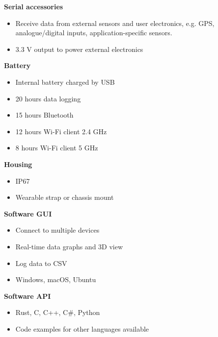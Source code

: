 \begin{multicols}{2}
\textbf{Serial accessories}
\begin{itemize}[nolistsep]
    \item Receive data from external sensors and user electronics, e.g. \acs{GPS}, analogue/digital inputs, application-specific sensors.
    \item 3.3 V output to power external electronics
\end{itemize}

\textbf{Battery}
\begin{itemize}[nolistsep]
    \item Internal battery charged by \acs{USB}
    \item 20 hours data logging
    \item 15 hours Bluetooth
    \item 12 hours Wi-Fi client 2.4 GHz
    \item 8 hours Wi-Fi client 5 GHz
\end{itemize}

\textbf{Housing}
\begin{itemize}[nolistsep]
    \item \acs{IP67}
    \item Wearable strap or chassis mount
\end{itemize}

\textbf{Software \acs{GUI}}
\begin{itemize}[nolistsep]
    \item Connect to multiple devices
    \item Real-time data graphs and 3D view
    \item Log data to \acs{CSV}
    \item Windows, macOS, Ubuntu
\end{itemize}

\textbf{Software \acs{API}}
\begin{itemize}[nolistsep]
    \item Rust, C, C++, C\#, Python
    \item Code examples for other languages available
\end{itemize}

\end{multicols}

\clearpage
